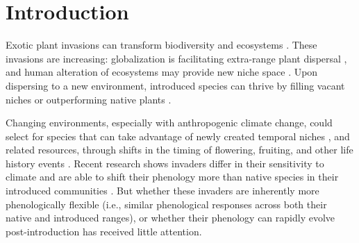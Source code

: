\documentclass[11pt]{article}\usepackage[]{graphicx}\usepackage[]{color}
\begin{document}
	\section{Introduction} 
	Exotic plant invasions can transform biodiversity and ecosystems \parencite{Bellard2016, Pejchar2009,Mack2000}. %
These invasions are increasing: globalization is facilitating extra-range plant dispersal \parencite{Helmus2014}, and human alteration of ecosystems may provide new niche space \parencite{Tilman2001, Blois2013,Inouye2008,Harte2015}. Upon dispersing to a new environment, introduced species can thrive by filling vacant niches \parencite{Elton1958} or outperforming native plants %
\parencite{Davis2001,Daehler2003}. 

Changing environments, especially with anthropogenic climate change, could select for species that can take advantage of newly created temporal niches \parencite{Wolkovich2011,godoy2014}, and related resources, through shifts in the timing of flowering, fruiting, and other life history events \parencite{Franks2007}. Recent research shows invaders differ in their sensitivity to climate \parencite{Reeb2020} and are able to shift their phenology more than native species in their introduced communities \parencite{Wolkovich2014,Reeb2020,Zettlemoyer2019}. But whether these invaders are inherently more phenologically flexible (i.e., similar phenological responses across both their native and introduced ranges), or whether their phenology can rapidly evolve post-introduction has received little attention.%
\end{document}

